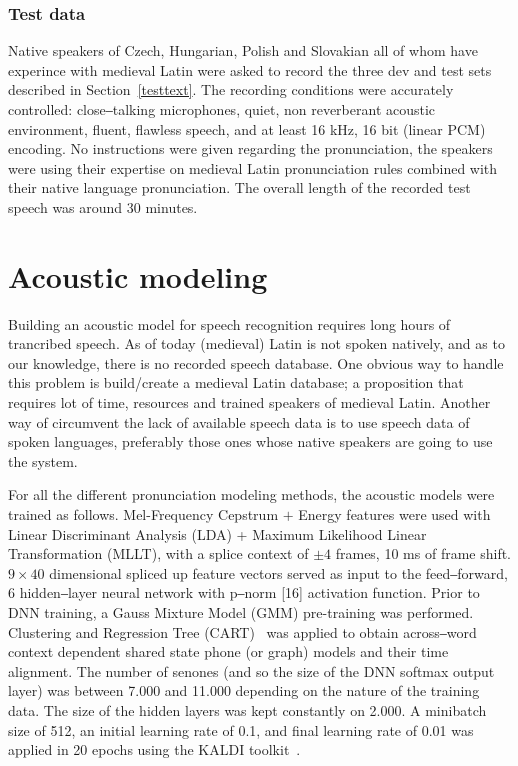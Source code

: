 \documentclass[runningheads,a4paper]{llncs}
\begin{document}
\subsubsection{Test data}
Native speakers of Czech, Hungarian, Polish and Slovakian all of whom have experince with medieval Latin were asked to record the three dev and test sets described in Section~\ref{testtext}.
The recording conditions were accurately controlled: close‒talking microphones, quiet, non reverberant acoustic environment, fluent, flawless speech, and at least 16 kHz, 16 bit (linear PCM) encoding.
No instructions were given regarding the pronunciation, the speakers were using their expertise on medieval Latin pronunciation rules combined with their native language pronunciation.
The overall length of the recorded test speech was around 30 minutes.

\section{Acoustic modeling}\label{AM}
Building an acoustic model for speech recognition requires long hours of trancribed speech.
As of today (medieval) Latin is not spoken natively, and as to our knowledge, there is no recorded speech database.
One obvious way to handle this problem is build/create a medieval Latin database; a proposition that requires lot of time, resources and trained speakers of medieval Latin. 
Another way of circumvent the lack of available speech data is to use speech data of spoken languages, preferably those ones whose native speakers are going to use the system. 

For all the different pronunciation modeling methods, the acoustic models were trained as follows.
Mel-Frequency Cepstrum $+$ Energy features were used with Linear Discriminant Analysis (LDA) + Maximum Likelihood Linear Transformation (MLLT), with a splice context of $\pm4$ frames, 10 ms of frame shift.
$9\times40$ dimensional spliced up feature vectors served as input to the feed‒forward, 6 hidden‒layer neural network with p‒norm [16] activation function.
Prior to DNN training, a Gauss Mixture Model (GMM) pre-training was performed.
Clustering and Regression Tree (CART)~\cite{kaldi} was applied to obtain across‒word context dependent shared state phone (or graph) models and their time alignment.
The number of senones (and so the size of the DNN softmax output layer) was between 7.000 and 11.000 depending on the nature of the training data.
The size of the hidden layers was kept constantly on 2.000.
A minibatch size of 512, an initial learning rate of 0.1, and final learning rate of 0.01 was applied in 20 epochs using the KALDI toolkit~\cite{kaldi}.
\end{document}
